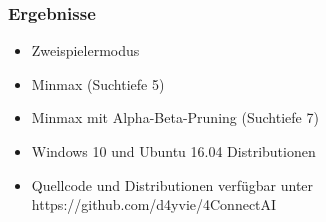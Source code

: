 



\begin{frame}
	\frametitle{Ergebnisse}
	\begin{itemize}
		\item Zweispielermodus
		\item Minmax (Suchtiefe 5)
		\item Minmax mit Alpha-Beta-Pruning (Suchtiefe 7)
		\item Windows 10 und Ubuntu 16.04 Distributionen
		\item Quellcode und Distributionen verfügbar unter https://github.com/d4yvie/4ConnectAI
	\end{itemize}
\end{frame}


